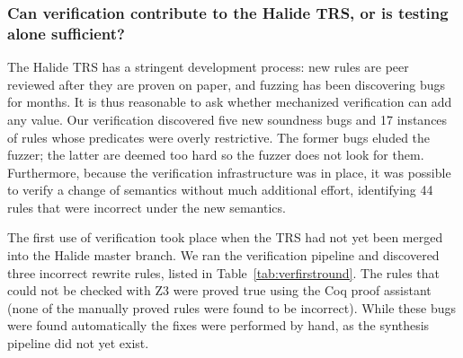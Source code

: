 \documentclass[acmsmall,review]{acmart}\settopmatter{printfolios=true,printccs=false,printacmref=false}
\begin{document}
\subsubsection{Can verification contribute to the Halide TRS, or is testing alone sufficient?}
\label{sec:eval-correctness}

The Halide TRS has a stringent development process: new rules are peer reviewed after they are proven on paper, and fuzzing has been discovering bugs for months. It is thus reasonable to ask whether mechanized verification can add any value. Our verification discovered five new soundness bugs and 17 instances of rules whose predicates were overly restrictive. The former bugs eluded the fuzzer; the latter are deemed too hard so the fuzzer does not look for them. Furthermore, because the verification infrastructure was in place, it was possible to verify a change of semantics without much additional effort, identifying 44 rules that were incorrect under the new semantics.

The first use of verification took place when the TRS had not yet been merged into the Halide master branch. We ran the verification pipeline and discovered three incorrect rewrite rules, listed in Table~\ref{tab:verfirstround}. The rules that could not be checked with Z3 were proved true using the Coq proof assistant (none of the manually proved rules were found to be incorrect). While these bugs were found automatically the fixes were performed by hand, as the synthesis pipeline did not yet exist. 
\end{document}

